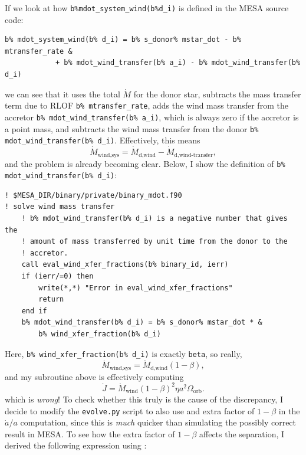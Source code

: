 \documentclass[a4paper,10pt]{article}
\begin{document}
If we look at how \lstinline[style=output, breaklines=true]|b%mdot_system_wind(b%d_i)| is defined in the MESA source code:
\begin{verbatim}
b% mdot_system_wind(b% d_i) = b% s_donor% mstar_dot - b% mtransfer_rate &
            + b% mdot_wind_transfer(b% a_i) - b% mdot_wind_transfer(b% d_i)
\end{verbatim}
we can see that it uses the total \(\dot{M} \) for the donor star, subtracts the mass transfer term due to RLOF \lstinline[style=output, breaklines=true]|b% mtransfer_rate|, adds the wind mass transfer from the accretor \lstinline[style=output, breaklines=true]|b% mdot_wind_transfer(b% a_i)|, which is always zero if the accretor is a point mass, and subtracts the wind mass transfer from the donor \lstinline[style=output, breaklines=true]|b% mdot_wind_transfer(b% d_i)|. Effectively, this means
\begin{equation*}
    \dot{M}_\text{wind,sys} = \dot{M}_\text{d,wind} - \dot{M}_\text{d,wind-transfer},
\end{equation*}
and the problem is already becoming clear. Below, I show the definition of \lstinline[style=output, breaklines=true]|b% mdot_wind_transfer(b% d_i)|:
\begin{verbatim}
! $MESA_DIR/binary/private/binary_mdot.f90
! solve wind mass transfer
    ! b% mdot_wind_transfer(b% d_i) is a negative number that gives the
    ! amount of mass transferred by unit time from the donor to the
    ! accretor.
    call eval_wind_xfer_fractions(b% binary_id, ierr)
    if (ierr/=0) then
        write(*,*) "Error in eval_wind_xfer_fractions"
        return
    end if
    b% mdot_wind_transfer(b% d_i) = b% s_donor% mstar_dot * &
        b% wind_xfer_fraction(b% d_i)
\end{verbatim}
Here, \lstinline[style=output, breaklines=true]|b% wind_xfer_fraction(b% d_i)| is exactly \lstinline[style=output, breaklines=true]|beta|, so really,
\begin{equation*}
    \dot{M}_\text{wind,sys} = \dot{M}_\text{d,wind} (1 - \beta ),
\end{equation*}
and my subroutine above is effectively computing
\begin{equation*}
    \dot{J}  = \dot{M}_\text{wind} (1 - \beta )^{2}\eta a^{2} \Omega_\text{orb}    .
\end{equation*}
which is \emph{wrong}! To check whether this truly is the cause of the discrepancy, I decide to modify the \lstinline[style=output, breaklines=true]|evolve.py| script to also use and extra factor of \(1-\beta \) in the \(\dot{a}  / a \) computation, since this is \emph{much} quicker than simulating the possibly correct result in MESA. To see how the extra factor of \(1-\beta \) affects the separation, I derived the following expression using \citet{saladino2018}:
\end{document}
